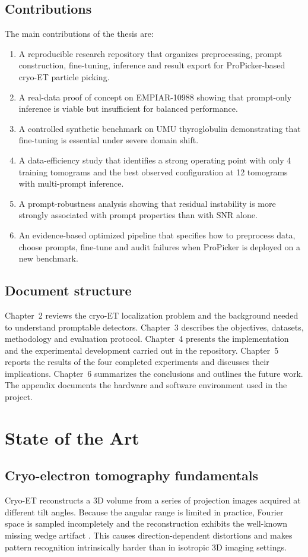 \documentclass[12pt,a4paper]{report}
\begin{document}
\section{Contributions}
The main contributions of the thesis are:
\begin{enumerate}
  \item A reproducible research repository that organizes preprocessing, prompt construction, fine-tuning, inference and result export for ProPicker-based cryo-ET particle picking.
  \item A real-data proof of concept on EMPIAR-10988 showing that prompt-only inference is viable but insufficient for balanced performance.
  \item A controlled synthetic benchmark on UMU thyroglobulin demonstrating that fine-tuning is essential under severe domain shift.
  \item A data-efficiency study that identifies a strong operating point with only 4 training tomograms and the best observed configuration at 12 tomograms with multi-prompt inference.
  \item A prompt-robustness analysis showing that residual instability is more strongly associated with prompt properties than with SNR alone.
  \item An evidence-based optimized pipeline that specifies how to preprocess data, choose prompts, fine-tune and audit failures when ProPicker is deployed on a new benchmark.
\end{enumerate}

\section{Document structure}
Chapter~2 reviews the cryo-ET localization problem and the background needed to understand promptable detectors. Chapter~3 describes the objectives, datasets, methodology and evaluation protocol. Chapter~4 presents the implementation and the experimental development carried out in the repository. Chapter~5 reports the results of the four completed experiments and discusses their implications. Chapter~6 summarizes the conclusions and outlines the future work. The appendix documents the hardware and software environment used in the project.

\chapter{State of the Art}

\section{Cryo-electron tomography fundamentals}
Cryo-ET reconstructs a 3D volume from a series of projection images acquired at different tilt angles. Because the angular range is limited in practice, Fourier space is sampled incompletely and the reconstruction exhibits the well-known missing wedge artifact \cite{lucic2013cryoet,beck2016cryoet}. This causes direction-dependent distortions and makes pattern recognition intrinsically harder than in isotropic 3D imaging settings.
\end{document}
